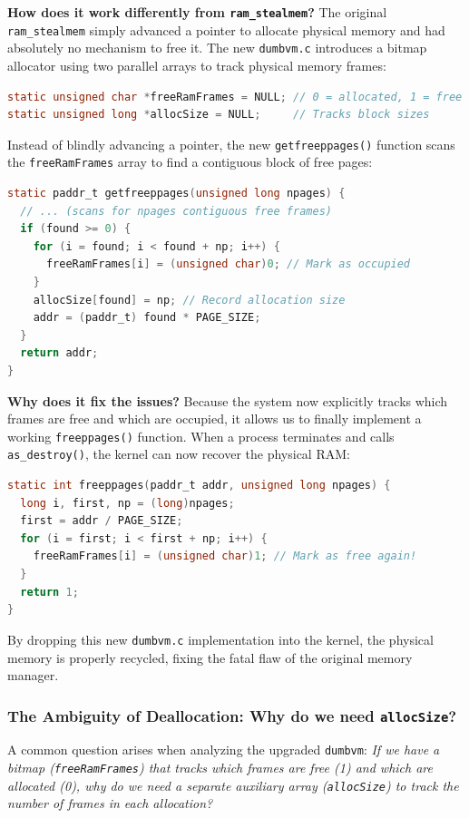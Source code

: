 \textbf{How does it work differently from \texttt{ram\_stealmem}?}
The original \texttt{ram\_stealmem} simply advanced a pointer to allocate physical memory and had absolutely no mechanism to free it. 
The new \texttt{dumbvm.c} introduces a bitmap allocator using two parallel arrays to track physical memory frames:
\begin{lstlisting}[language=C]
static unsigned char *freeRamFrames = NULL; // 0 = allocated, 1 = free
static unsigned long *allocSize = NULL;     // Tracks block sizes
\end{lstlisting}

Instead of blindly advancing a pointer, the new \texttt{getfreeppages()} function scans the \texttt{freeRamFrames} array to find a contiguous block of free pages:
\begin{lstlisting}[language=C]
static paddr_t getfreeppages(unsigned long npages) {
  // ... (scans for npages contiguous free frames)
  if (found >= 0) {
    for (i = found; i < found + np; i++) {
      freeRamFrames[i] = (unsigned char)0; // Mark as occupied
    }
    allocSize[found] = np; // Record allocation size
    addr = (paddr_t) found * PAGE_SIZE;
  }
  return addr;
}
\end{lstlisting}

\textbf{Why does it fix the issues?}
Because the system now explicitly tracks which frames are free and which are occupied, it allows us to finally implement a working \texttt{freeppages()} function. When a process terminates and calls \texttt{as\_destroy()}, the kernel can now recover the physical RAM:
\begin{lstlisting}[language=C]
static int freeppages(paddr_t addr, unsigned long npages) {
  long i, first, np = (long)npages;    
  first = addr / PAGE_SIZE;
  for (i = first; i < first + np; i++) {
    freeRamFrames[i] = (unsigned char)1; // Mark as free again!
  }
  return 1;
}
\end{lstlisting}
By dropping this new \texttt{dumbvm.c} implementation into the kernel, the physical memory is properly recycled, fixing the fatal flaw of the original memory manager.

\subsubsection*{The Ambiguity of Deallocation: Why do we need \texttt{allocSize}?}
A common question arises when analyzing the upgraded \texttt{dumbvm}: \textit{If we have a bitmap (\texttt{freeRamFrames}) that tracks which frames are free (1) and which are allocated (0), why do we need a separate auxiliary array (\texttt{allocSize}) to track the number of frames in each allocation?}

